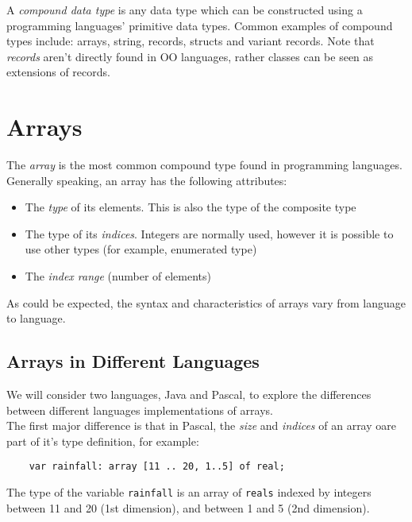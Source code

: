 
A \textit{compound data type} is any data type which can be constructed using a programming languages' primitive data types. Common examples of compound types include: arrays, string, records, structs and variant records. Note that \textit{records} aren't directly found in OO languages, rather classes can be seen as extensions of records.

\section{Arrays}
The \textit{array} is the most common compound type found in programming languages. Generally speaking, an array has the following attributes:
\begin{itemize}
    \item The \textit{type} of its elements. This is also the type of the composite type
    \item The type of its \textit{indices}. Integers are normally used, however it is possible to use other types (for example, enumerated type)
    \item The \textit{index range} (number of elements)
\end{itemize}

As could be expected, the syntax and characteristics of arrays vary from language to language.

\subsection{Arrays in Different Languages}
We will consider two languages, Java and Pascal, to explore the differences between different languages implementations of arrays.\\

The first major difference is that in Pascal, the \textit{size} and \textit{indices} of an array oare part of it's type definition, for example:
\begin{verbatim}
    var rainfall: array [11 .. 20, 1..5] of real;
\end{verbatim}
The type of the variable \verb|rainfall| is an array of \verb|reals| indexed by integers between 11 and 20 (1st dimension), and between 1 and 5 (2nd dimension).\\

